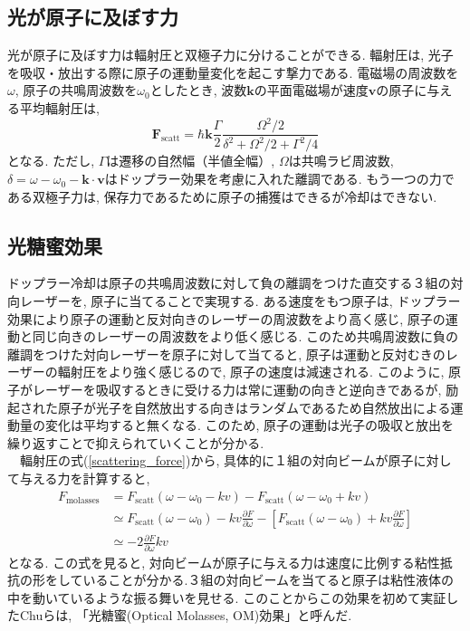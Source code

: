 \documentclass[uplatex, dvipdfmx, a4paper, report, papersize, 11pt]{jsbook}
\begin{document}
\subsection{光が原子に及ぼす力}
 光が原子に及ぼす力は輻射圧と双極子力に分けることができる. 輻射圧は, 光子を吸収・放出する際に原子の運動量変化を起こす撃力である\cite{ノーベル賞と分光学}.
 電磁場の周波数を$\omega$, 原子の共鳴周波数を$\omega_0$としたとき, 波数$\bm k$の平面電磁場が速度$\bm v$の原子に与える平均輻射圧は,
 \begin{equation}\label{scattering_force}
\bm{F} _ { \mathrm { scatt } } = \hbar \bm{k}\frac { \Gamma } { 2 } \frac { \Omega ^ { 2 } / 2 } { \delta ^ { 2 } + \Omega ^ { 2 } / 2 + \Gamma ^ { 2 } / 4 }
 \end{equation}
となる\cite{Foot:1080846}. ただし, $\Gamma$は遷移の自然幅（半値全幅）, $\Omega$は共鳴ラビ周波数, $\delta = \omega - \omega _ { 0 } - \bm{k} \cdot \bm{v}$はドップラー効果を考慮に入れた離調である. もう一つの力である双極子力は, 保存力であるために原子の捕獲はできるが冷却はできない\cite{ノーベル賞と分光学}.

\subsection{光糖蜜効果}
ドップラー冷却は原子の共鳴周波数に対して負の離調をつけた直交する３組の対向レーザーを, 原子に当てることで実現する. ある速度をもつ原子は, ドップラー効果により原子の運動と反対向きのレーザーの周波数をより高く感じ, 原子の運動と同じ向きのレーザーの周波数をより低く感じる. このため共鳴周波数に負の離調をつけた対向レーザーを原子に対して当てると, 原子は運動と反対むきのレーザーの輻射圧をより強く感じるので, 原子の速度は減速される. このように, 原子がレーザーを吸収するときに受ける力は常に運動の向きと逆向きであるが, 励起された原子が光子を自然放出する向きはランダムであるため自然放出による運動量の変化は平均すると無くなる. このため, 原子の運動は光子の吸収と放出を繰り返すことで抑えられていくことが分かる.\\
　輻射圧の式(\ref{scattering_force})から, 具体的に１組の対向ビームが原子に対して与える力を計算すると,
\begin{equation}
  \begin{split}
    F _ { \mathrm{molasses} } &= F _ { \mathrm{scatt}  } \left( \omega - \omega _ { 0 } - k v \right) - F _ {  \mathrm{scatt} }  \left( \omega - \omega _ { 0 } + k v \right)
    \\& \simeq F _ { \mathrm{scatt}  } \left( \omega - \omega _ { 0 } \right) - k v \frac { \partial F } { \partial \omega } - \left[ F _ {  \mathrm{scatt} } \left( \omega - \omega _ { 0 } \right) + k v \frac { \partial F } { \partial \omega } \right]
    \\& \simeq - 2 \frac { \partial F } { \partial \omega } k v
  \end{split}
\end{equation}
となる. この式を見ると, 対向ビームが原子に与える力は速度に比例する粘性抵抗の形をしていることが分かる.３組の対向ビームを当てると原子は粘性液体の中を動いているような振る舞いを見せる. このことからこの効果を初めて実証したChuらは, 「光糖蜜(Optical Molasses,  OM)効果」と呼んだ.
\end{document}
